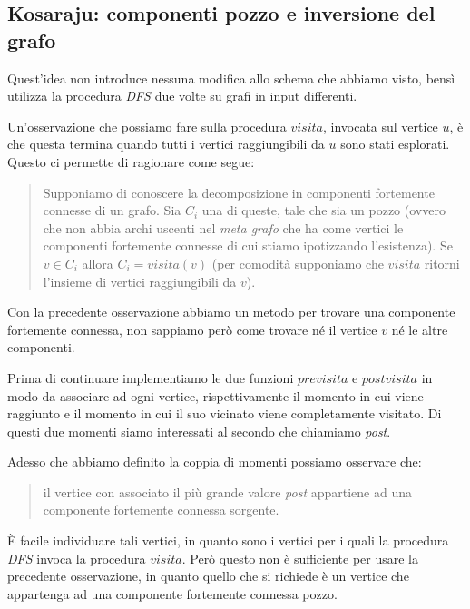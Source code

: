 \subsection{Kosaraju: componenti pozzo e inversione del grafo}
\label{subsection:kosaraju-algorithm}
Quest'idea non introduce nessuna modifica allo schema che abbiamo
visto, bens\`i utilizza la procedura \emph{DFS} due volte su grafi in
input differenti.

Un'osservazione che possiamo fare sulla procedura $visita$,
invocata sul vertice $u$, \`e che questa termina quando tutti i
vertici raggiungibili da $u$ sono stati esplorati. Questo ci permette
di ragionare come segue:
\begin{quotation}
  Supponiamo di conoscere la decomposizione in componenti fortemente
  connesse di un grafo. Sia $C_{i}$ una di queste, tale che sia un
  pozzo (ovvero che non abbia archi uscenti nel \emph{meta grafo} che
  ha come vertici le componenti fortemente connesse di cui stiamo
  ipotizzando l'esistenza). Se $v \in C_{i}$ allora $C_{i} =
  visita(v)$ (per comodit\`a supponiamo che $visita$ ritorni
  l'insieme di vertici raggiungibili da $v$).
\end{quotation}

Con la precedente osservazione abbiamo un metodo per trovare una
componente fortemente connessa, non sappiamo per\`o come trovare n\'e il
vertice $v$ n\'e le altre componenti.

Prima di continuare implementiamo le due funzioni $previsita$ e
$postvisita$ in modo da associare ad ogni vertice, rispettivamente il
momento in cui viene raggiunto e il momento in cui il suo vicinato
viene completamente visitato. Di questi due momenti siamo interessati
al secondo che chiamiamo \emph{post}.

Adesso che abbiamo definito la coppia di momenti possiamo osservare
che:
\begin{quotation}
  il vertice con associato il pi\`u grande valore \emph{post}
  appartiene ad una componente fortemente connessa sorgente.
\end{quotation}

\`E facile individuare tali vertici, in quanto sono i vertici per i
quali la procedura \emph{DFS} invoca la procedura
$visita$. Per\`o questo non \`e sufficiente per usare la
precedente osservazione, in quanto quello che si richiede \`e un
vertice che appartenga ad una componente fortemente connessa pozzo.

